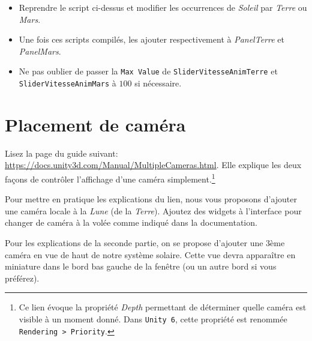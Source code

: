 \documentclass[a4paper,10pt]{article}
\newenvironment{solution}%
{\begin{tcolorbox}[breakable,colback=red!5!white,colframe=red!75!black,title=Solution]}%
{\end{tcolorbox}}
\begin{document}
\begin{solution}
\begin{itemize}
	\item Reprendre le script ci-dessus et modifier les occurrences de \textit{Soleil} par \textit{Terre} ou \textit{Mars}.
	\item Une fois ces scripts compilés, les ajouter respectivement à \textit{PanelTerre} et \textit{PanelMars}.
	\item Ne pas oublier de passer la \texttt{Max Value} de \texttt{SliderVitesseAnimTerre} et \texttt{SliderVitesseAnimMars} à $100$ si nécessaire.
\end{itemize}

\end{solution}
\fi 

\section{Placement de caméra}

Lisez la page du guide suivant: \url{https://docs.unity3d.com/Manual/MultipleCameras.html}. Elle explique les deux façons de contrôler l'affichage d'une caméra simplement.\footnote{Ce lien évoque la propriété \textit{Depth} permettant de déterminer quelle caméra est visible à un moment donné. Dans \texttt{Unity~6}, cette propriété est renommée \texttt{Rendering > Priority}.}

Pour mettre en pratique les explications du lien, nous vous proposons d'ajouter une caméra locale à la \textit{Lune} (de la \textit{Terre}). Ajoutez des widgets à l'interface pour changer de caméra à la volée comme indiqué dans la documentation.

Pour les explications de la seconde partie, on se propose d'ajouter une 3ème caméra en vue de haut de notre système solaire. Cette vue devra apparaître en miniature dans le bord bas gauche de la fenêtre (ou un autre bord si vous préférez).
\end{document}
